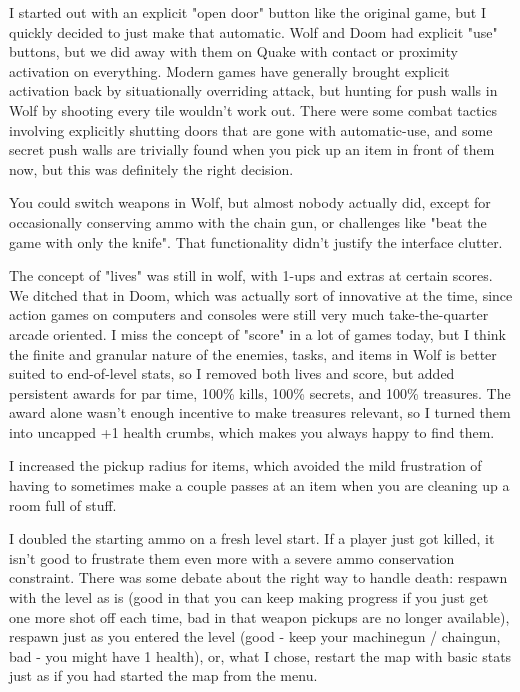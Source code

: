 \documentclass[book.tex]{subfiles}
\begin{document}
I started out with an explicit "open door" button like the original game, but I quickly decided to just make that automatic.  Wolf and Doom had explicit "use" buttons, but we did away with them on Quake with contact or proximity activation on everything.  Modern games have generally brought explicit activation back by situationally overriding attack, but hunting for push walls in Wolf by shooting every tile wouldn't work out.  There were some combat tactics involving explicitly shutting doors that are gone with automatic-use, and some secret push walls are trivially found when you pick up an item in front of them now, but this was definitely the right decision.\\
\par

You could switch weapons in Wolf, but almost nobody actually did, except for occasionally conserving ammo with the chain gun, or challenges like "beat the game with only the knife".  That functionality didn't justify the interface clutter.\\
\par

The concept of "lives" was still in wolf, with 1-ups and extras at certain scores.  We ditched that in Doom, which was actually sort of innovative at the time, since action games on computers and consoles were still very much take-the-quarter arcade oriented.  I miss the concept of "score" in a lot of games today, but I think the finite and granular nature of the enemies, tasks, and items in Wolf is better suited to end-of-level stats, so I removed both lives and score, but added persistent awards for par time, 100\% kills, 100\% secrets, and 100\% treasures.  The award alone wasn't enough incentive to make treasures relevant, so I turned them into uncapped +1 health crumbs, which makes you always happy to find them.\\
\par

I increased the pickup radius for items, which avoided the mild frustration of having to sometimes make a couple passes at an item when you are cleaning up a room full of stuff.\\
\par

I doubled the starting ammo on a fresh level start.  If a player just got killed, it isn't good to frustrate them even more with a severe ammo conservation constraint.  There was some debate about the right way to handle death:  respawn with the level as is (good in that you can keep making progress if you just get one more shot off each time, bad in that weapon pickups are no longer available), respawn just as you entered the level (good - keep your machinegun / chaingun, bad - you might have 1 health), or, what I chose, restart the map with basic stats just as if you had started the map from the menu.\\
\par
\end{document}
